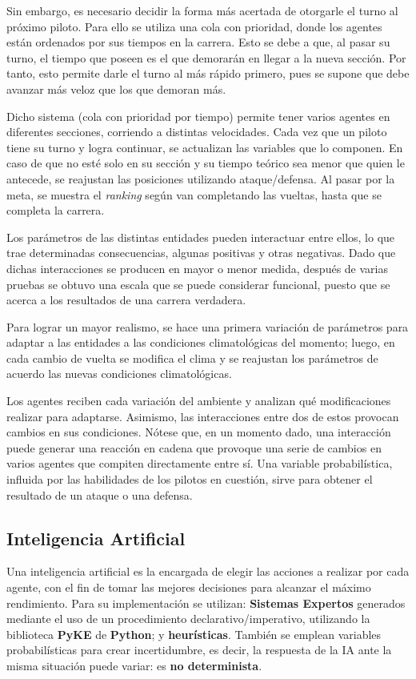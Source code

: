 \documentclass[12pt, letterpaper,spanish]{article}
\theoremstyle{definition}
\theoremstyle{remark}
\begin{document}
		Sin embargo, es necesario decidir la forma más acertada de otorgarle el turno al próximo piloto. Para ello se utiliza una cola con prioridad, donde los agentes están ordenados por sus tiempos en la carrera. Esto se debe a que, al pasar su turno, el tiempo que poseen es el que demorarán en llegar a la nueva sección. Por tanto, esto permite darle el turno al más rápido primero, pues se supone que debe avanzar más veloz que los que demoran más.

		Dicho sistema (cola con prioridad por tiempo) permite tener varios agentes en diferentes secciones, corriendo a distintas velocidades. Cada vez que un piloto tiene su turno y logra continuar, se actualizan las variables que lo componen. En caso de que no esté solo en su sección y su tiempo teórico sea menor que quien le antecede, se reajustan las posiciones utilizando ataque/defensa. Al pasar por la meta, se muestra el \emph{ranking} según van completando las vueltas, hasta que se completa la carrera.

		Los parámetros de las distintas entidades pueden interactuar entre ellos, lo que trae determinadas consecuencias, algunas positivas y otras negativas. Dado que dichas interacciones se producen en mayor o menor medida, después de varias pruebas se obtuvo una escala que se puede considerar funcional, puesto que se acerca a los resultados de una carrera verdadera. 

		Para lograr un mayor realismo, se hace una primera variación de parámetros para adaptar a las entidades a las condiciones climatológicas del momento; luego, en cada cambio de vuelta se modifica el clima y se reajustan los parámetros de acuerdo las nuevas condiciones climatológicas.

		Los agentes reciben cada variación del ambiente y analizan qué modificaciones realizar para adaptarse. Asimismo, las interacciones entre dos de estos provocan cambios en sus condiciones. Nótese que, en un momento dado, una interacción puede generar una reacción en cadena que provoque una serie de cambios en varios agentes que compiten directamente entre sí. Una variable probabilística, influida por las habilidades de los pilotos en cuestión, sirve para obtener el resultado de un ataque o una defensa.

	\newpage

	\subsection{Inteligencia Artificial  {\footnotesize \cite{conferenciasIA}\cite{russell}}}
	Una inteligencia artificial es la encargada de elegir las acciones a realizar por cada agente, con el fin de tomar las mejores decisiones para alcanzar el máximo rendimiento. Para su implementación se utilizan: \textbf{Sistemas Expertos} generados mediante el uso de un procedimiento declarativo/imperativo, utilizando la biblioteca \textbf{PyKE}{\footnotesize \cite{pyke}} de \textbf{Python}; y \textbf{heurísticas}. También se emplean variables probabilísticas para crear incertidumbre, es decir, la respuesta de la IA ante la misma situación puede variar: es \textbf{no determinista}.
	
\end{document}
